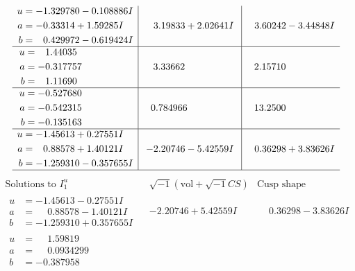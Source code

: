 \documentclass[1p]{elsarticle_modified}
\theoremstyle{definition}
\newcommand{\I}{\sqrt{-1}}
\begin{document}
$$\begin{array}{c|c|c}
\begin{aligned}
u &= -1.329780 - 0.108886 I \\
a &= -0.33314 + 1.59285 I \\
b &= \phantom{-}0.429972 - 0.619424 I\end{aligned}
 & \phantom{-}3.19833 + 2.02641 I & \phantom{-}3.60242 - 3.44848 I \\ \hline\begin{aligned}
u &= \phantom{-}1.44035\phantom{ +0.000000I} \\
a &= -0.317757\phantom{ +0.000000I} \\
b &= \phantom{-}1.11690\phantom{ +0.000000I}\end{aligned}
 & \phantom{-}3.33662\phantom{ +0.000000I} & \phantom{-}2.15710\phantom{ +0.000000I} \\ \hline\begin{aligned}
u &= -0.527680\phantom{ +0.000000I} \\
a &= -0.542315\phantom{ +0.000000I} \\
b &= -0.135163\phantom{ +0.000000I}\end{aligned}
 & \phantom{-}0.784966\phantom{ +0.000000I} & \phantom{-}13.2500\phantom{ +0.000000I} \\ \hline\begin{aligned}
u &= -1.45613 + 0.27551 I \\
a &= \phantom{-}0.88578 + 1.40121 I \\
b &= -1.259310 - 0.357655 I\end{aligned}
 & -2.20746 - 5.42559 I & \phantom{-}0.36298 + 3.83626 I\\
 \hline 
 \end{array}$$\newpage$$\begin{array}{c|c|c}  
\text{Solutions to }I^u_{1}& \I (\text{vol} + \sqrt{-1}CS) & \text{Cusp shape}\\
 \hline 
\begin{aligned}
u &= -1.45613 - 0.27551 I \\
a &= \phantom{-}0.88578 - 1.40121 I \\
b &= -1.259310 + 0.357655 I\end{aligned}
 & -2.20746 + 5.42559 I & \phantom{-}0.36298 - 3.83626 I \\ \hline\begin{aligned}
u &= \phantom{-}1.59819\phantom{ +0.000000I} \\
a &= \phantom{-}0.0934299\phantom{ +0.000000I} \\
b &= -0.387958\phantom{ +0.000000I}\end{aligned}

\end{array}$$
\end{document}
